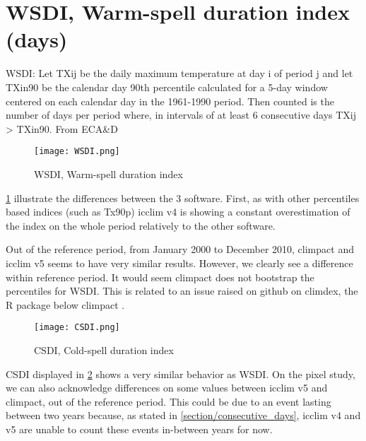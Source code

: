 \documentclass[a4paper,11pt]{article}
\begin{document}
    \section{WSDI, Warm-spell duration index (days)}
        WSDI: Let TXij be the daily maximum temperature at day i of period j and let
        TXin90 be the calendar day 90th percentile calculated for a 5-day window centered on each calendar day in the 1961-1990 period.
        Then counted is the number of days per period where, in intervals of at least 6 consecutive days TXij > TXin90. 
        From ECA\&D\cite{doc/ecad_new}

        \begin{figure}[!hbt]
            \centering
            \texttt{[image: WSDI.png]}
            \caption{WSDI, Warm-spell duration index}
            \label{figure/wsdi}
        \end{figure}
        
        \ref{figure/wsdi} illustrate the differences between the 3 software.
        First, as with other percentiles based indices (such as Tx90p) icclim v4 is showing a constant overestimation of the index on the whole period relatively to the other software.

        Out of the reference period, from January 2000 to December 2010, climpact and icclim v5 seems to have very similar results.
        However, we clearly see a difference within reference period. It would seem climpact does not bootstrap the percentiles for WSDI.
        This is related to an issue raised on github on climdex, the R package below climpact \cite{gh/wsdi_issue}.
    
        \begin{figure}[!hbt]
            \centering
            \texttt{[image: CSDI.png]}
            \caption{CSDI, Cold-spell duration index}
            \label{figure/csdi}
        \end{figure}

        CSDI displayed in \ref{figure/csdi} shows a very similar behavior as WSDI.
        On the pixel study, we can also acknowledge differences on some values between icclim v5 and climpact, out of the reference period.
        This could be due to an event lasting between two years because, as stated in \ref{section/consecutive_days}, icclim v4 and v5 are unable to count these events in-between years for now.
 
    
\end{document}
